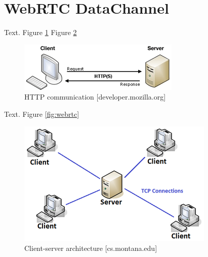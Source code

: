 \section{WebRTC DataChannel} \label{chapter_datachannel}

Text. Figure \ref{fig:http} Figure \ref{fig:websocket}

\begin{figure}[htp]
  \begin{center}
    \includegraphics[width=0.9\columnwidth]{resources/http.png}
  \end{center}
  \caption{HTTP communication [developer.mozilla.org]}
  \label{fig:http}
\end{figure}

Text. Figure \ref{fig:webrtc}

\begin{figure}[htp]
  \begin{center}
    \includegraphics[width=0.9\columnwidth]{resources/websocket.png}
  \end{center}
  \caption{Client-server architecture [cs.montana.edu]}
  \label{fig:websocket}
\end{figure}

